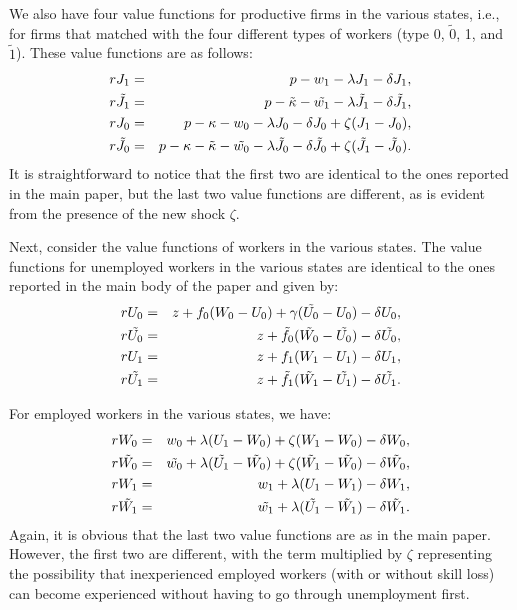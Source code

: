 \documentclass[12pt]{article} %
\theoremstyle{definition}
\begin{document}
We also have four value functions for productive firms in the various states, i.e., for firms that matched with the four different types of workers (type 0, $\tilde{0}$, 1, and $\tilde{1}$). These value functions are as follows: 
\begin{eqnarray}
    rJ_1 &=& p - w_1 - \lambda J_1 - \delta J_1, \nonumber \\
    r\Tilde{J_1} &=& p - \Tilde{\kappa} - \Tilde{w_1} - \lambda \Tilde{J_1} - \delta \Tilde{J_1}, \nonumber \\
    rJ_0 &=& p - \kappa - w_0 - \lambda J_0 - \delta J_0 + \zeta (J_1-J_0), \nonumber \\
    r\Tilde{J_0} &=& p - \kappa - \Tilde{\kappa} - \Tilde{w_0} - \lambda \Tilde{J_0} - \delta \Tilde{J_0} + \zeta (\Tilde{J_1}-\Tilde{J_0}).\nonumber 
\end{eqnarray}It is straightforward to notice that the first two are identical to the ones reported in the main paper, but the last two value functions are different, as is evident from the presence of the new shock $\zeta$. 

Next, consider the value functions of workers in the various states. The value functions for unemployed workers in the various states are identical to the ones reported in the main body of the paper and given by:
\begin{eqnarray}
    rU_0 &=& z + f_0 (W_0 - U_0) + \gamma (\Tilde{U_0} - U_0) - \delta U_0, \nonumber \\
    r\Tilde{U_0} &=& z + \Tilde{f_0} (\Tilde{W_0} - \Tilde{U_0}) - \delta \Tilde{U_0},\nonumber  \\
    rU_1 &=& z + f_1 (W_1 - U_1) - \delta U_1, \nonumber \\
    r\Tilde{U_1} &=& z + \Tilde{f_1} (\Tilde{W_1} - \Tilde{U_1}) - \delta \Tilde{U_1}.\nonumber 
\end{eqnarray}

For employed workers in the various states, we have:
\begin{eqnarray}
    rW_0 &=& w_0 + \lambda (U_1 - W_0) + \zeta(W_1-W_0) - \delta W_0 ,\nonumber  \\
    r\Tilde{W_0} &=& \Tilde{w_0} + \lambda (\Tilde{U_1} - \Tilde{W_0}) + \zeta(\Tilde{W_1}-\Tilde{W_0}) - \delta \Tilde{W_0}, \nonumber \\
    rW_1 &=& w_1 + \lambda (U_1 - W_1)-\delta W_1, \nonumber \\
    r\Tilde{W_1} &=& \Tilde{w_1} + \lambda (\Tilde{U_1} - \Tilde{W_1}) -\delta \Tilde{W_1}.\nonumber 
\end{eqnarray}
Again, it is obvious that the last two value functions are as in the main paper. However, the first two are different, with the term multiplied by $\zeta$ representing the possibility that inexperienced employed workers (with or without skill loss) can become experienced without having to go through unemployment first.  
\end{document}
